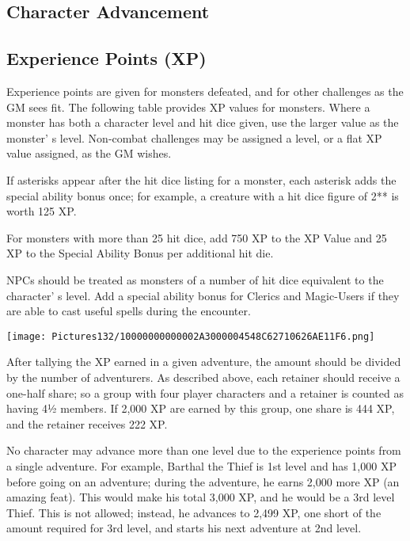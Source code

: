 \documentclass[a4paper,twoside,openany,10pt]{book}
\begin{document}
\subsection{Character Advancement}\label{character-advancement}

\begin{multicols}{2}

\subsection{Experience Points (XP)}\label{experience-points-xp}

Experience points are given for monsters defeated, and for other challenges as the GM sees fit. The following table provides XP values for monsters. Where a monster has both a character level and hit dice given, use the larger value as the monster' s level. Non-combat challenges may be assigned a level, or a flat XP value assigned, as the GM wishes.

If asterisks appear after the hit dice listing for a monster, each asterisk adds the special ability bonus once; for example, a creature with a hit dice figure of 2** is worth 125 XP.

For monsters with more than 25 hit dice, add 750 XP to the XP Value and 25 XP to the Special Ability Bonus per additional hit die. 

NPCs should be treated as monsters of a number of hit dice equivalent to the character' s level. Add a special ability bonus for Clerics and Magic-Users if they are able to cast useful spells during the encounter.


\begin{flushleft}
	\texttt{[image: Pictures132/10000000000002A3000004548C62710626AE11F6.png]}
\end{flushleft}

After tallying the XP earned in a given adventure, the amount should be divided by the number of adventurers. As described above, each retainer should receive a one-half share; so a group with four player characters and a retainer is counted as having 4½ members. If 2,000 XP are earned by this group, one share is 444 XP, and the retainer receives 222 XP. 

No character may advance more than one level due to the experience points from a single adventure. For example, Barthal the Thief is 1st level and has 1,000 XP before going on an adventure; during the adventure, he earns 2,000 more XP (an amazing feat). This would make his total 3,000 XP, and he would be a 3rd level Thief. This is not allowed; instead, he advances to 2,499 XP, one short of the amount required for 3rd level, and starts his next adventure at 2nd level.\\\medskip


\end{multicols}
\end{document}
